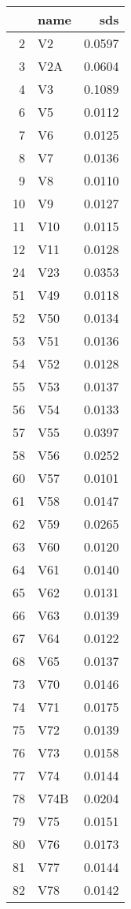 \documentclass{amsart}
\begin{document}
\begin{longtable}{rlr}
  \hline
 & name & sds \\ 
  \hline
2 & V2 & 0.0597 \\ 
  3 & V2A & 0.0604 \\ 
  4 & V3 & 0.1089 \\ 
  6 & V5 & 0.0112 \\ 
  7 & V6 & 0.0125 \\ 
  8 & V7 & 0.0136 \\ 
  9 & V8 & 0.0110 \\ 
  10 & V9 & 0.0127 \\ 
  11 & V10 & 0.0115 \\ 
  12 & V11 & 0.0128 \\ 
  24 & V23 & 0.0353 \\ 
  51 & V49 & 0.0118 \\ 
  52 & V50 & 0.0134 \\ 
  53 & V51 & 0.0136 \\ 
  54 & V52 & 0.0128 \\ 
  55 & V53 & 0.0137 \\ 
  56 & V54 & 0.0133 \\ 
  57 & V55 & 0.0397 \\ 
  58 & V56 & 0.0252 \\ 
  60 & V57 & 0.0101 \\ 
  61 & V58 & 0.0147 \\ 
  62 & V59 & 0.0265 \\ 
  63 & V60 & 0.0120 \\ 
  64 & V61 & 0.0140 \\ 
  65 & V62 & 0.0131 \\ 
  66 & V63 & 0.0139 \\ 
  67 & V64 & 0.0122 \\ 
  68 & V65 & 0.0137 \\ 
  73 & V70 & 0.0146 \\ 
  74 & V71 & 0.0175 \\ 
  75 & V72 & 0.0139 \\ 
  76 & V73 & 0.0158 \\ 
  77 & V74 & 0.0144 \\ 
  78 & V74B & 0.0204 \\ 
  79 & V75 & 0.0151 \\ 
  80 & V76 & 0.0173 \\ 
  81 & V77 & 0.0144 \\ 
  82 & V78 & 0.0142 \\ 

\end{longtable}
\end{document}
